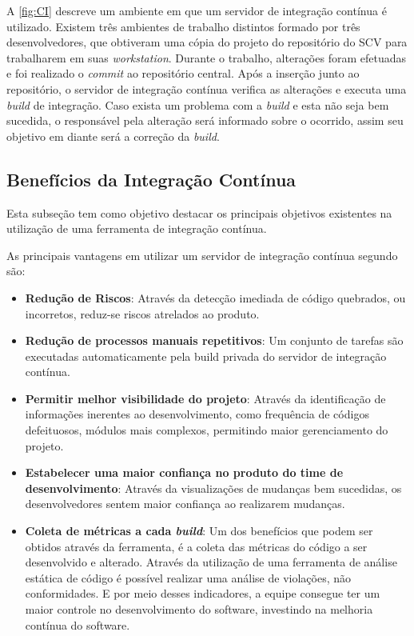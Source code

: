 A \autoref{fig:CI} descreve um ambiente em que um servidor de integração contínua é utilizado. Existem três ambientes de trabalho distintos formado por três desenvolvedores, que obtiveram uma cópia do projeto do repositório do SCV para trabalharem em suas \textit{workstation}. Durante o trabalho, alterações foram efetuadas e foi realizado o \textit{commit} ao repositório central. Após a inserção junto ao repositório, o servidor de integração contínua verifica as alterações e executa uma \textit{build} de integração. Caso exista um problema com a \textit{build} e esta não seja bem sucedida, o responsável pela alteração será informado sobre o ocorrido, assim seu objetivo em diante será a correção da \textit{build}.

\subsection{Benefícios da Integração Contínua}

Esta subseção tem como objetivo destacar os principais objetivos existentes na utilização de uma ferramenta de integração contínua.

As principais vantagens em utilizar um servidor de integração contínua segundo  são:

\begin{itemize}
\item {\textbf{Redução de Riscos}}: 
Através da detecção imediada de código quebrados, ou incorretos, reduz-se riscos atrelados ao produto.
\item {\textbf{Redução de processos manuais repetitivos}}:
Um conjunto de tarefas são executadas automaticamente pela build privada do servidor de integração contínua.
\item {\textbf{Permitir melhor visibilidade do projeto}}:
Através da identificação de informações inerentes ao desenvolvimento, como frequência de códigos defeituosos, módulos mais complexos, permitindo maior gerenciamento do projeto.
\item {\textbf{Estabelecer uma maior confiança no produto do time de desenvolvimento}}:
Através da visualizações de mudanças bem sucedidas, os desenvolvedores sentem maior confiança ao realizarem mudanças.

\item\textbf{Coleta de métricas a cada \textit{build}}: Um dos benefícios que podem ser obtidos através da ferramenta, é a coleta das métricas do código a ser desenvolvido e alterado. Através da utilização de uma ferramenta de análise estática de código é possível realizar uma análise de violações, não conformidades. E por meio desses indicadores, a equipe consegue ter um maior controle no desenvolvimento do software, investindo na melhoria contínua do software.
\end{itemize}	

